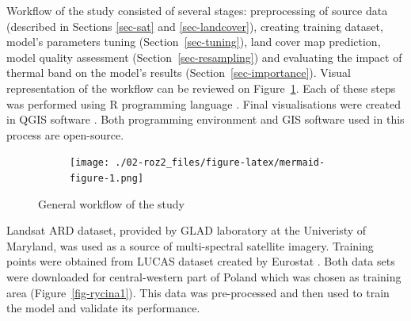 \documentclass{amuthesis}
\begin{document}
Workflow of the study consisted of several stages: preprocessing of
source data (described in Sections \ref{sec-sat} and
\ref{sec-landcover}), creating training dataset, model's parameters
tuning (Section~\ref{sec-tuning}), land cover map prediction, model
quality assessment (Section~\ref{sec-resampling}) and evaluating the
impact of thermal band on the model's results
(Section~\ref{sec-importance}). Visual representation of the workflow
can be reviewed on Figure~\ref{fig-rycina4}. Each of these steps was
performed using R programming language \autocite{R-base}. Final
visualisations were created in QGIS software
\autocite{qgis_development_team_qgis_2009}. Both programming environment
and GIS software used in this process are open-source.

\begin{figure}

{\centering 

\begin{figure}[H]

{\centering \texttt{[image: ./02-roz2\_files/figure-latex/mermaid-figure-1.png]}

}

\end{figure}

}

\caption{\label{fig-rycina4}General workflow of the study}

\end{figure}

Landsat ARD dataset, provided by GLAD laboratory at the Univeristy of
Maryland, was used as a source of multi-spectral satellite imagery.
Training points were obtained from LUCAS dataset created by Eurostat
\autocite{dandrimont_harmonised_2020}. Both data sets were downloaded
for central-western part of Poland which was chosen as training area
(Figure~\ref{fig-rycina1}). This data was pre-processed and then used to
train the model and validate its performance.
\end{document}
